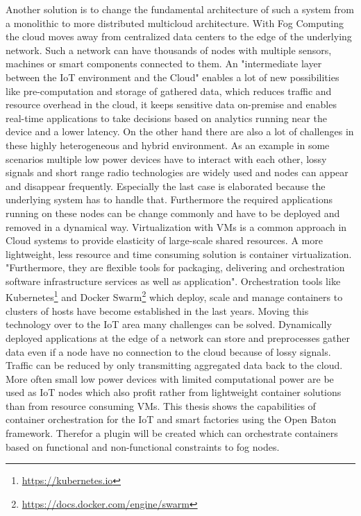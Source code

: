 Another solution is to change the fundamental architecture of such a system from a monolithic to more distributed multicloud architecture.
With Fog Computing the cloud moves away from centralized data centers to the edge of the underlying network.\cite[cf.][p. 380]{Pahl:2015}
Such a network can have thousands of nodes with multiple sensors, machines or smart components connected to them.
An "intermediate layer between the IoT environment and the Cloud"\cite[p.236]{Brito:2016} enables a lot of new possibilities like pre-computation and storage of gathered data, which reduces traffic and resource overhead in the cloud, it keeps sensitive data on-premise\cite[cf.][p.236]{Brito:2016} and enables real-time applications to take decisions based on analytics running near the device and a lower latency.
On the other hand there are also a lot of challenges in these highly heterogeneous and hybrid environment.
As an example in some scenarios multiple low power devices have to interact with each other, lossy signals and short range radio technologies are widely used and nodes can appear and disappear frequently.\cite[cf.][p. 325]{Yannuzzi:2014}
Especially the last case is elaborated because the underlying system has to handle that.
Furthermore the required applications running on these nodes can be change commonly and have to be deployed and removed in a dynamical way.
Virtualization with \acp{VM} is a common approach in Cloud systems to provide elasticity of large-scale shared resources.\cite[cf.][p. 117]{Pahl:2016}
A more lightweight, less resource and time consuming solution is container virtualization.
"Furthermore, they are flexible tools for packaging, delivering and orchestration software infrastructure services as well as application"\cite[p. 117]{Pahl:2016}.
Orchestration tools like Kubernetes\footnote{\url{https://kubernetes.io}} and Docker Swarm\footnote{\url{https://docs.docker.com/engine/swarm}} which deploy, scale and manage containers to clusters of hosts have become established in the last years.
Moving this technology over to the \ac{IoT} area many challenges can be solved.
Dynamically deployed applications at the edge of a network can store and preprocesses gather data even if a node have no connection to the cloud because of lossy signals.
Traffic can be reduced by only transmitting aggregated data back to the cloud.
More often small low power devices with limited computational power are be used as \ac{IoT} nodes which also profit rather from lightweight container solutions than from resource consuming \acp{VM}.
This thesis shows the capabilities of container orchestration for the \ac{IoT} and smart factories using the Open Baton framework.
Therefor a plugin will be created which can orchestrate containers based on functional and non-functional constraints to fog nodes.

